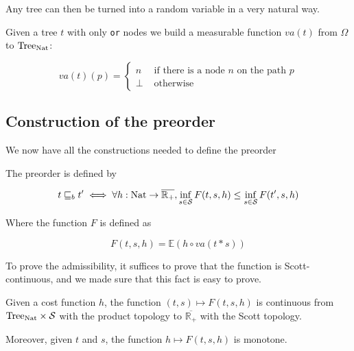Any tree can then be turned into a random variable in 
a very natural way. 

\begin{adefinition}
    Given a tree $t$ with only \texttt{or} nodes we 
    build a measurable function $va(t)$ from $\Omega$ to $\textnormal{Tree}_{\textnormal{Nat}}$:

    \begin{equation*}
        va(t)(p) = \begin{cases}
            n  & \text{ if there is a node } n \text{ on the path } p \\
            \bot & \text{ otherwise } 
        \end{cases}
    \end{equation*}
\end{adefinition}


\subsection{Construction of the preorder}

We now have all the constructions needed to define the preorder

\begin{adefinition}[Preorder]
    The preorder is defined by

    \begin{equation*}
        t \sqsubseteq_b t' \iff \forall h : \textnormal{Nat} \to \overline{\mathbb{R}_+}, 
        \inf_{ s \in \mathcal{S}} F (t,s,h) \leq \inf_{s \in \mathcal{S}} F (t',s,h)
    \end{equation*}

    Where the function $F$ is defined as 

    \begin{equation*}
        F(t,s,h) = \mathbb{E}(h \circ va(t * s))
    \end{equation*}
\end{adefinition}

To prove the admissibility, it suffices to prove that the function 
is Scott-continuous, and we made sure that this fact is easy to prove.

\begin{alemma}
    Given a cost function $h$, the function 
    $(t,s) \mapsto F(t,s,h)$ is continuous from $\textnormal{Tree}_{\textnormal{Nat}} \times
    \mathcal{S}$ with the product topology to $\overline{\mathbb{R}_+}$ with the 
    Scott topology.

    Moreover, given $t$ and $s$, the function $h \mapsto F(t,s,h)$ is monotone.
\end{alemma}

